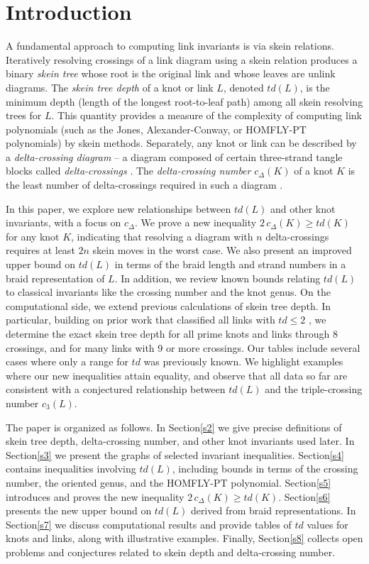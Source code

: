 \documentclass[pdftex, a4paper, 12pt, oneside]{amsart}
\numberwithin{equation}{section}
\theoremstyle{plain}
\theoremstyle{definition}
\begin{document}
	\section{Introduction}
	A fundamental approach to computing link invariants is via skein relations. Iteratively resolving crossings of a link diagram using a skein relation produces a binary \emph{skein tree} whose root is the original link and whose leaves are unlink diagrams. The \emph{skein tree depth} of a knot or link $L$, denoted $td(L)$, is the minimum depth (length of the longest root-to-leaf path) among all skein resolving trees for $L$. This quantity provides a measure of the complexity of computing link polynomials (such as the Jones, Alexander-Conway, or HOMFLY-PT polynomials) by skein methods. Separately, any knot or link can be described by a \emph{delta-crossing diagram} -- a diagram composed of certain three-strand tangle blocks called \emph{delta-crossings} \cite{NSS15}. The \emph{delta-crossing number} $c_\Delta(K)$ of a knot $K$ is the least number of delta-crossings required in such a diagram \cite{NSS15}. 
	
	In this paper, we explore new relationships between $td(L)$ and other knot invariants, with a focus on $c_\Delta$. We prove a new inequality $2\,c_\Delta(K) \ge td(K)$ for any knot $K$, indicating that resolving a diagram with $n$ delta-crossings requires at least $2n$ skein moves in the worst case. We also present an improved upper bound on $td(L)$ in terms of the braid length and strand numbers in a braid representation of $L$. In addition, we review known bounds relating $td(L)$ to classical invariants like the crossing number and the knot genus. On the computational side, we extend previous calculations of skein tree depth. In particular, building on prior work that classified all links with $td\le 2$ \cite{Tho89}, we determine the exact skein tree depth for all prime knots and links through 8 crossings, and for many links with 9 or more crossings. Our tables include several cases where only a range for $td$ was previously known. We highlight examples where our new inequalities attain equality, and observe that all data so far are consistent with a conjectured relationship between $td(L)$ and the triple-crossing number $c_3(L)$. 
	
	The paper is organized as follows. In Section\;\ref{s2} we give precise definitions of skein tree depth, delta-crossing number, and other knot invariants used later. In Section\;\ref{s3} we present the graphs of selected invariant inequalities. Section\;\ref{s4} contains inequalities involving $td(L)$, including bounds in terms of the crossing number, the oriented genus, and the HOMFLY-PT polynomial. Section\;\ref{s5} introduces and proves the new inequality $2\,c_\Delta(K)\ge td(K)$. Section\;\ref{s6} presents the new upper bound on $td(L)$ derived from braid representations. In Section\;\ref{s7} we discuss computational results and provide tables of $td$ values for knots and links, along with illustrative examples. Finally, Section\;\ref{s8} collects open problems and conjectures related to skein depth and delta-crossing number.
	
\end{document}
